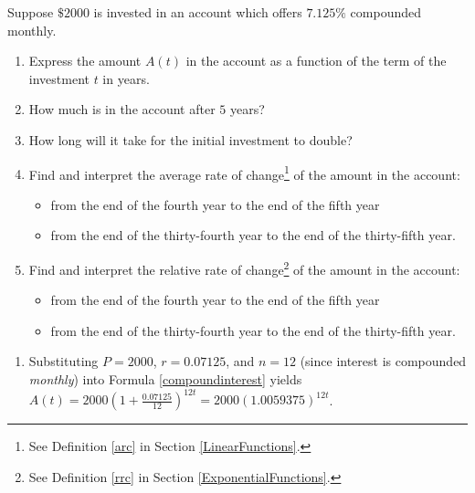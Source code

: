 \documentclass{ximera}
\begin{document}
\begin{example}  \label{compoundinterestex} Suppose $\$2000$ is invested in an account which offers $7.125 \%$ compounded monthly.

\begin{enumerate}

\item Express the amount $A(t)$ in the account as a function of the term of the investment $t$ in years.

\item  How much is in the account after $5$ years? 

\item  How long will it take for the initial investment to double?

\item  Find and interpret the average rate of change\footnote{See Definition \ref{arc} in Section \ref{LinearFunctions}.} of the amount in the account:

\begin{itemize}

\item  from the end of the fourth year to the end of the fifth year

\item from the end of the thirty-fourth year to the end of the thirty-fifth year.

\end{itemize}

\item  Find and interpret the relative rate of change\footnote{See Definition \ref{rrc} in Section \ref{ExponentialFunctions}.} of the amount in the account: 

\begin{itemize}

\item  from the end of the fourth year to the end of the fifth year

\item from the end of the thirty-fourth year to the end of the thirty-fifth year.

\end{itemize}

\end{enumerate}

\begin{explanation}

\begin{enumerate}

\item  Substituting $P = 2000$, $r = 0.07125$, and $n = 12$ (since interest is compounded \textit{monthly}) into Formula \ref{compoundinterest} yields $A(t) = 2000\left(1 + \frac{0.07125}{12}\right)^{12t}=2000 (1.0059375)^{12t}$.


\end{enumerate}
\end{explanation}
\end{example}
\end{document}
